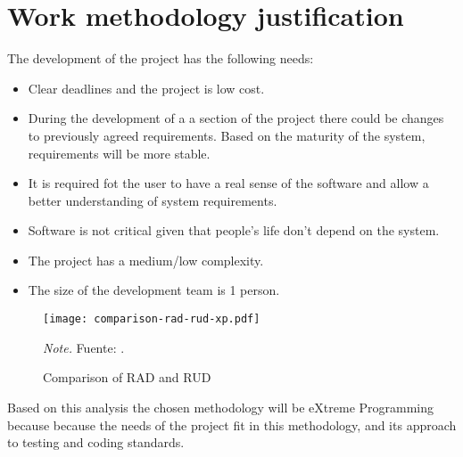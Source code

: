 \section{Work methodology justification}
\label{sec:methodology-justification}

The development of the project has the following needs:

\begin{itemize}
    \item Clear deadlines and the project is low cost.
    \item During the development of a a section of the project there could be changes to previously agreed requirements.
    Based on the maturity of the system, requirements will be more stable.
    \item It is required fot the  user to have a real sense of the software and allow a better understanding of system requirements.
    \item Software is not critical given that people's life don't depend on the system.
    \item The project has a medium/low complexity.
    \item The size of the development team is 1 person.
\end{itemize}

\begin{figure}
    \centering
    \caption{Comparison of RAD and RUD}
    \texttt{[image: comparison-rad-rud-xp.pdf]}
    \label{fig:comparison-rad-rud-xp}

    \vspace{0.5em}
    \begin{minipage}{\textwidth}
        \small\textit{Note.} Fuente: \textcite{geambasu2011influence}.
    \end{minipage}
\end{figure}

Based on this analysis the chosen methodology will be eXtreme Programming because because the needs of the project fit in this methodology, and its approach to testing and coding standards.


